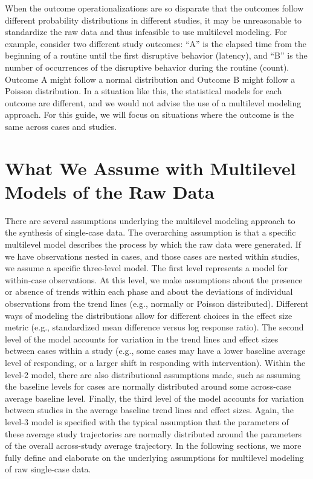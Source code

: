 \documentclass[
]{book}
\begin{document}
When the outcome operationalizations are so disparate that the outcomes follow different probability distributions in different studies, it may be unreasonable to standardize the raw data and thus infeasible to use multilevel modeling.
For example, consider two different study outcomes: ``A'' is the elapsed time from the beginning of a routine until the first disruptive behavior (latency), and ``B'' is the number of occurrences of the disruptive behavior during the routine (count).
Outcome A might follow a normal distribution and Outcome B might follow a Poisson distribution.
In a situation like this, the statistical models for each outcome are different, and we would not advise the use of a multilevel modeling approach.
For this guide, we will focus on situations where the outcome is the same across cases and studies.

\hypertarget{what-we-assume-with-multilevel-models-of-the-raw-data}{%
\section{What We Assume with Multilevel Models of the Raw Data}\label{what-we-assume-with-multilevel-models-of-the-raw-data}}

There are several assumptions underlying the multilevel modeling approach to the synthesis of single-case data.
The overarching assumption is that a specific multilevel model describes the process by which the raw data were generated.
If we have observations nested in cases, and those cases are nested within studies, we assume a specific three-level model.
The first level represents a model for within-case observations.
At this level, we make assumptions about the presence or absence of trends within each phase and about the deviations of individual observations from the trend lines (e.g., normally or Poisson distributed).
Different ways of modeling the distributions allow for different choices in the effect size metric (e.g., standardized mean difference versus log response ratio).
The second level of the model accounts for variation in the trend lines and effect sizes between cases within a study (e.g., some cases may have a lower baseline average level of responding, or a larger shift in responding with intervention).
Within the level-2 model, there are also distributional assumptions made, such as assuming the baseline levels for cases are normally distributed around some across-case average baseline level.
Finally, the third level of the model accounts for variation between studies in the average baseline trend lines and effect sizes.
Again, the level-3 model is specified with the typical assumption that the parameters of these average study trajectories are normally distributed around the parameters of the overall across-study average trajectory.
In the following sections, we more fully define and elaborate on the underlying assumptions for multilevel modeling of raw single-case data.
\end{document}
